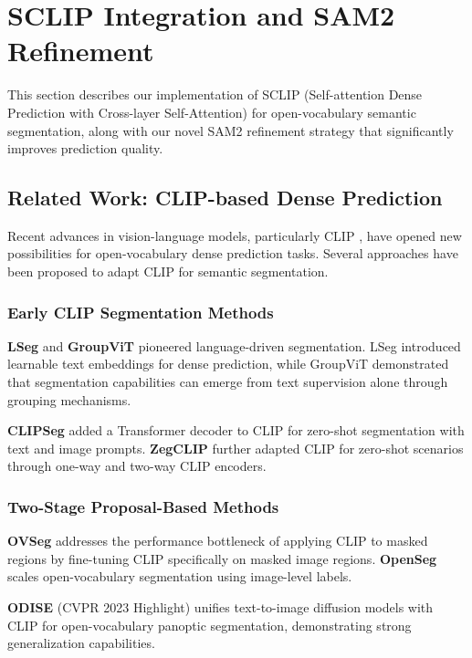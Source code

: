 \section{SCLIP Integration and SAM2 Refinement}

This section describes our implementation of SCLIP (Self-attention Dense Prediction with Cross-layer Self-Attention) for open-vocabulary semantic segmentation, along with our novel SAM2 refinement strategy that significantly improves prediction quality.

\subsection{Related Work: CLIP-based Dense Prediction}

Recent advances in vision-language models, particularly CLIP \cite{radford2021learning}, have opened new possibilities for open-vocabulary dense prediction tasks. Several approaches have been proposed to adapt CLIP for semantic segmentation.

\subsubsection{Early CLIP Segmentation Methods}

\textbf{LSeg} \cite{li2022language} and \textbf{GroupViT} \cite{xu2022groupvit} pioneered language-driven segmentation. LSeg introduced learnable text embeddings for dense prediction, while GroupViT demonstrated that segmentation capabilities can emerge from text supervision alone through grouping mechanisms.

\textbf{CLIPSeg} \cite{luddecke2022clipseg} added a Transformer decoder to CLIP for zero-shot segmentation with text and image prompts. \textbf{ZegCLIP} \cite{zhang2022zegclip} further adapted CLIP for zero-shot scenarios through one-way and two-way CLIP encoders.

\subsubsection{Two-Stage Proposal-Based Methods}

\textbf{OVSeg} \cite{liang2023ovseg} addresses the performance bottleneck of applying CLIP to masked regions by fine-tuning CLIP specifically on masked image regions. \textbf{OpenSeg} \cite{ghiasi2022scaling} scales open-vocabulary segmentation using image-level labels.

\textbf{ODISE} \cite{xu2023odise} (CVPR 2023 Highlight) unifies text-to-image diffusion models with CLIP for open-vocabulary panoptic segmentation, demonstrating strong generalization capabilities.


